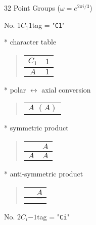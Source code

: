 \documentclass[fleqn,10pt,landscape]{jsarticle}
\begin{document}
\setcounter{MaxMatrixCols}{16}

\begin{center}
\LARGE
32 Point Groups ($\omega=e^{2\pi i/3}$)
\end{center}
No. 1\quad$C_{1}$\quad$1$\quad[ triclinic ]
tag = "{\tt C1}"

* character table
\begin{quote}
\begin{tabular}{cr} \hline \hline
$ C_{1} $ & $ 1 $ \\ \hline
$ A $ & $ 1 $ \\
 \hline \hline
\end{tabular}
\end{quote}
* polar $\leftrightarrow$ axial conversion
\begin{quote}
\begin{tabular}{c}
$ A\,\,(A) $
\end{tabular}
\end{quote}
* symmetric product
\begin{quote}
\begin{tabular}{c|c} \hline \hline
 & $ A $ \\ \hline
$ A $ & $ A $ \\
 \hline \hline
\end{tabular}
\end{quote}
* anti-symmetric product
\begin{quote}
\begin{tabular}{cc} \hline \hline
 & $ A $ \\ \hline
$  $ & $ - $ \\
 \hline \hline
\end{tabular}
\end{quote}
\newpage
No. 2\quad$C_{i}$\quad$-1$\quad[ triclinic ]
tag = "{\tt Ci}"
\end{document}
